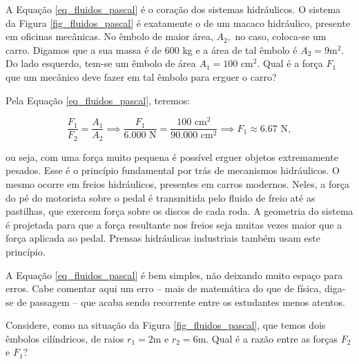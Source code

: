 



A Equação \eqref{eq_fluidos_pascal} é o coração dos sistemas hidráulicos. O sistema da Figura \ref{fig_fluidos_pascal} é exatamente o de um macaco hidráulico, presente em oficinas mecânicas. No êmbolo de maior área, $A_2,$ no caso, coloca-se um carro. Digamos que a sua massa é de 600 kg e a área de tal êmbolo é $A_2 = 9$m$^2$. Do lado esquerdo, tem-se um êmbolo de área $A_1 = 100 $ cm$^2$. Qual é a força $F_1$ que um mecânico deve fazer em tal êmbolo para erguer o carro?

Pela Equação \eqref{eq_fluidos_pascal}, teremos:

$$ \dfrac{F_1}{F_2} = \dfrac{A_1}{A_2} \implies \dfrac{F_1}{6.000 \text{ N}} = \dfrac{100 \text{ cm}^2}{90.000 \text{ cm}^2} 
\implies  \boxed{F_1 \approx 6.67\text{ N},} $$

\noindent ou seja, com uma força muito pequena é possível erguer objetos extremamente pesados. Esse é o princípio fundamental por trás de mecanismos hidráulicos. O mesmo ocorre em freios hidráulicos, presentes em carros modernos. Neles, a força do pé do motorista sobre o pedal é transmitida pelo fluido de freio até as pastilhas, que exercem força sobre os discos de cada roda. A geometria do sistema é projetada para que a força resultante nos freios seja muitas vezes maior que a força aplicada ao pedal. Prensas hidráulicas industriais também usam este princípio.




A Equação \eqref{eq_fluidos_pascal} é bem simples, não deixando muito espaço para erros. Cabe comentar aqui um erro -- mais de matemática do que de física, diga-se de passagem -- que acaba sendo recorrente entre os estudantes menos atentos.

Considere, como na situação da Figura \ref{fig_fluidos_pascal}, que temos dois êmbolos cilíndricos, de raios $r_1 = 2$m e $r_2 = 6$m. Qual é a razão entre as forças $F_2$ e $F_1?$

